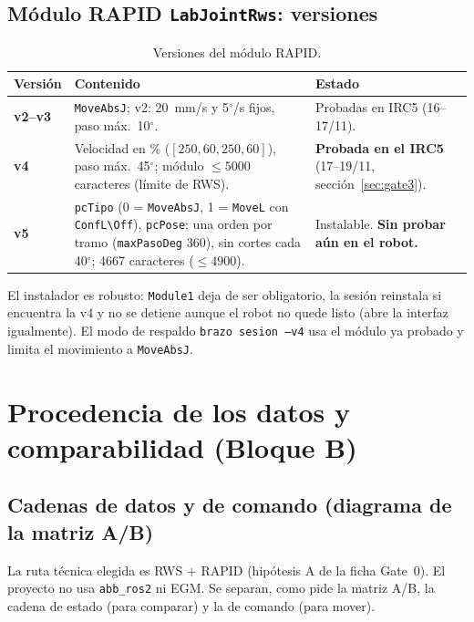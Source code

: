 \documentclass[10pt,a4paper]{article}
\begin{document}
\subsection{Módulo RAPID \texttt{LabJointRws}: versiones}
\begin{table}[H]
\centering\small
\renewcommand{\arraystretch}{1.15}
\begin{tabularx}{\textwidth}{@{}>{\bfseries}l>{\raggedright\arraybackslash}X>{\raggedright\arraybackslash}p{4.0cm}@{}}
\toprule
Versión & Contenido & Estado\\
\midrule
v2--v3 & \texttt{MoveAbsJ}; v2: 20~mm/s y 5$^\circ$/s fijos, paso máx.\ 10$^\circ$. & Probadas en IRC5 (16--17/11).\\
v4 & Velocidad en \% ($[250,60,250,60]$), paso máx.\ 45$^\circ$; módulo $\le5000$ caracteres (límite de RWS). & \textbf{Probada en el IRC5} (17--19/11, sección~\ref{sec:gate3}).\\
v5 & \texttt{pcTipo} (0 = \texttt{MoveAbsJ}, 1 = \texttt{MoveL} con \texttt{ConfL\textbackslash Off}), \texttt{pcPose}; una orden por tramo (\texttt{maxPasoDeg} 360), sin cortes cada 40$^\circ$; 4667 caracteres ($\le4900$). & Instalable. \textbf{Sin probar aún en el robot.}\\
\bottomrule
\end{tabularx}
\caption{Versiones del módulo RAPID.}
\end{table}
El instalador es robusto: \texttt{Module1} deja de ser obligatorio, la sesión reinstala si encuentra la v4 y no se detiene aunque el robot no quede listo (abre la interfaz igualmente). El modo de respaldo \texttt{brazo sesion --v4} usa el módulo ya probado y limita el movimiento a \texttt{MoveAbsJ}.

\section{Procedencia de los datos y comparabilidad (Bloque B)}
\label{sec:arqdatos}
\label{sec:arq}

\subsection{Cadenas de datos y de comando (diagrama de la matriz A/B)}
La ruta técnica elegida es RWS + RAPID (hipótesis A de la ficha Gate~0). El proyecto no usa \texttt{abb\_ros2} ni EGM. Se separan, como pide la matriz A/B, la cadena de estado (para comparar) y la de comando (para mover).
\end{document}
